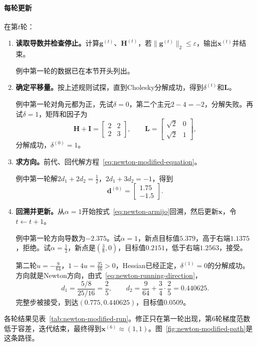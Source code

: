 \paragraph{每轮更新}
在第$t$轮：
\begin{enumerate}
 \item \textbf{读取导数并检查停止。}计算$\bm{g}^{(t)}$、$\bm{H}^{(t)}$，若$\lVert\bm{g}^{(t)}\rVert_2\leq\varepsilon$，输出$\bm{x}^{(t)}$并结束。

 例中第一轮的数据已在本节开头列出。

 \item \textbf{确定平移量。}按上述规则试探，直到Cholesky分解成功，得到$\delta^{(t)}$和$\bm{L}$。

 例中第一轮对角元都为正，先试$\delta=0$，第二个主元$2-4=-2$，分解失败。再试$\delta=1$，矩阵和因子为
 \[
  \bm{H}+\bm{I}=\begin{bmatrix}2&2\\2&3\end{bmatrix},\qquad
  \bm{L}=\begin{bmatrix}\sqrt2&0\\\sqrt2&1\end{bmatrix},
 \]
 分解成功，$\delta^{(0)}=1$。

 \item \textbf{求方向。}前代、回代解方程~\eqref{eq:newton-modified-equation}。

 例中第一轮解$2d_1+2d_2=\tfrac12$，$2d_1+3d_2=-1$，得到
 \[
  \bm{d}^{(0)}=\begin{bmatrix}1.75\\-1.5\end{bmatrix}.
 \]

 \item \textbf{回溯并更新。}从$\alpha=1$开始按式~\eqref{eq:newton-armijo}回溯，然后更新$\bm{x}$，令$t\leftarrow t+1$。

 例中第一轮方向导数为$-2.375$。试$\alpha=1$，新点目标值$5.379$，高于右端$1.1375$，拒绝。试$\alpha=\tfrac12$，新点是$(\tfrac38,0)$，目标值$0.2151$，低于右端$1.2563$，接受。

 第二轮$u=-\tfrac9{64}$，$1-4u=\tfrac{25}{16}>0$，Hessian已经正定，$\delta^{(1)}=0$的分解成功。方向就是Newton方向，由式~\eqref{eq:newton-running-direction}，
 \[
  d_1=\frac{5/8}{25/16}=\frac25,\qquad d_2=\frac9{64}+\frac34\cdot\frac25=0.440625.
 \]
 完整步被接受，到达$(0.775,0.440625)$，目标值$0.0509$。
\end{enumerate}

各轮结果见表~\ref{tab:newton-modified-run}。修正只在第一轮出现，第$6$轮梯度范数低于容差，迭代结束，最终得到$\bm{x}^{(6)}\approx(1,1)$。图~\ref{fig:newton-modified-path}是这条路径。

